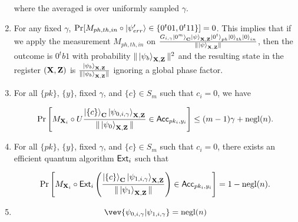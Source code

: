 \begin{lemma}
\begin{enumerate}
    where the averaged is over uniformly sampled $\gamma$.
\item For any fixed $\gamma$, $\Pr[M_{ph,th,in}\circ \ket{\psi'_{err}} \in \{0^t01,0^t11\}] =0$. %
This implies that if we apply the measurement $M_{ph,th,in}$ on $\frac{G_{i,\gamma} \ket{0^m}_{\mathbf{C}}\ket{\psi}_{\mathbf{X},\mathbf{Z}}\ket{0^t}_{ph}\ket{0}_{th}\ket{0}_{in}}{\|\ket{\psi}_{\mathbf{X},\mathbf{Z}}\|}$, then the outcome is $0^tb1$ with probability $\|\ket{\psi_b}_{\mathbf{X},\mathbf{Z}}\|^2$ and the resulting state in the register $(\mathbf{X},\mathbf{Z})$  is $\frac{\ket{\psi_b}_{\mathbf{X},\mathbf{Z}}}{\|\ket{\psi_b}_{\mathbf{X},\mathbf{Z}}\|}$ ignoring a global phase factor.

    
    
  
    
        \item 
For all $\{pk\}$, $\{y\}$, fixed $\gamma$, and $\{c\}\in S_m$ such that $c_i = 0$, we have 
 
     \begin{align*}
 \Pr\left[M_{\mathbf{X}_i}\circ U\frac{\ket{\{c\}}_{\mathbf{C}}\ket{\psi_{0,i,\gamma}}_{\mathbf{X},\mathbf{Z}}}{\|\ket{\psi_0}_{\mathbf{X},\mathbf{Z}}\|}\in \mathsf{Acc}_{pk_i,y_i}\right]\leq (m-1)\gamma+\operatorname{negl}(n).
 \end{align*}



    \item 
For all $\{pk\}$, $\{y\}$, fixed $\gamma$, and $\{c\}\in S_m$ such that $c_i = 0$, there exists an efficient quantum algorithm $\mathsf{Ext}_i$ such that 

\begin{align*}  
  \Pr\left[M_{\mathbf{X}_i}\circ \mathsf{Ext}_i\left(\frac{\ket{\{c\}}_{\mathbf{C}}\ket{\psi_{1,i,\gamma}}_{\mathbf{X},\mathbf{Z}}}{\|\ket{\psi_1}_{\mathbf{X},\mathbf{Z}}\|}\right)\in \mathsf{Acc}_{pk_i,y_i}\right]=1-\operatorname{negl}(n).
  \end{align*}
  
  
\item {}
$$\vev{\psi_{0,i,\gamma}|\psi_{1,i,\gamma}} = \negl(n)$$
\end{enumerate}
\end{lemma}
